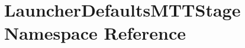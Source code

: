 \hypertarget{namespaceLauncherDefaultsMTTStage}{\section{Launcher\-Defaults\-M\-T\-T\-Stage Namespace Reference}
\label{namespaceLauncherDefaultsMTTStage}
}
